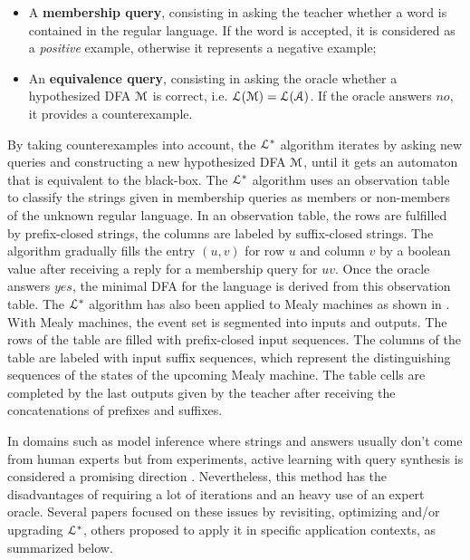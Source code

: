 \begin{itemize}
    \item A \textbf{membership query}, consisting in asking the
        teacher whether a word is contained in the regular
        language.  If the word is accepted, it is considered as a
        \textit{positive} example, otherwise it represents a
        negative example;

    \item An \textbf{equivalence query}, consisting in asking the
        oracle whether a hypothesized DFA $\EuScript{M}$ is
        correct, i.e. $\EuScript{L}(\EuScript{M}) =
        \EuScript{L}(\EuScript{A})$. If the oracle answers $no$,
        it provides a counterexample.
\end{itemize}

By taking counterexamples into account, the $\EuScript{L}^*$
algorithm iterates by asking new queries and constructing a new
hypothesized DFA $\EuScript{M}$, until it gets an automaton that
is equivalent to the black-box. The $\EuScript{L}^*$ algorithm
uses an observation table to classify the strings given in
membership queries as members or non-members of the unknown
regular language. In an observation table, the rows are fulfilled
by prefix-closed strings, the columns are labeled by
suffix-closed strings. The algorithm gradually fills the entry
$(u,v)$ for row $u$ and column $v$ by a boolean value after
receiving a reply for a membership query for $uv$. Once the
oracle answers $yes$, the minimal DFA for the language is derived
from this observation table. The $\EuScript{L}^*$
algorithm has also been applied to Mealy machines as shown in
\cite{DBLP:phd/de/Niese2003,steffen11}. With Mealy machines, the
event set is segmented into inputs and outputs. The rows of the
table are filled with prefix-closed input sequences. The columns
of the table are labeled with input suffix sequences, which
represent the distinguishing sequences of the states of the
upcoming Mealy machine. The table cells are completed by the last
outputs given by the teacher after receiving the concatenations
of prefixes and suffixes.

In domains such as model inference where strings and answers
usually don't come from human experts but from experiments,
active learning with query synthesis is considered a promising
direction \cite{settles.tr09}. Nevertheless, this method has the
disadvantages of requiring a lot of iterations and an heavy use
of an expert oracle. Several papers focused on these issues by
revisiting, optimizing and/or upgrading $\EuScript{L}^*$, others
proposed to apply it in specific application contexts, as
summarized below.

